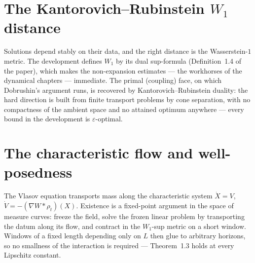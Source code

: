 
\chapter[The Kantorovich--Rubinstein W1 distance]{The Kantorovich--Rubinstein $W_1$ distance}

Solutions depend stably on their data, and the right distance is the Wasserstein-$1$
metric. The development defines $W_1$ by its dual sup-formula (Definition~1.4 of the
paper), which makes the non-expansion estimates --- the workhorses of the dynamical
chapters --- immediate. The primal (coupling) face, on which Dobrushin's argument runs, is
recovered by Kantorovich--Rubinstein duality: the hard direction is built from finite
transport problems by cone separation, with no compactness of the ambient space and no
attained optimum anywhere --- every bound in the development is $\varepsilon$-optimal.


\chapter{The characteristic flow and well-posedness}

The Vlasov equation transports mass along the characteristic system
$\dot X = V$, $\dot V = -(\nabla W * \rho_t)(X)$. Existence is a fixed-point argument in
the space of measure curves: freeze the field, solve the frozen linear problem by
transporting the datum along its flow, and contract in the $W_1$-sup metric on a short
window. Windows of a fixed length depending only on $L$ then glue to arbitrary horizons,
so no smallness of the interaction is required --- Theorem~1.3 holds at every Lipschitz
constant.

